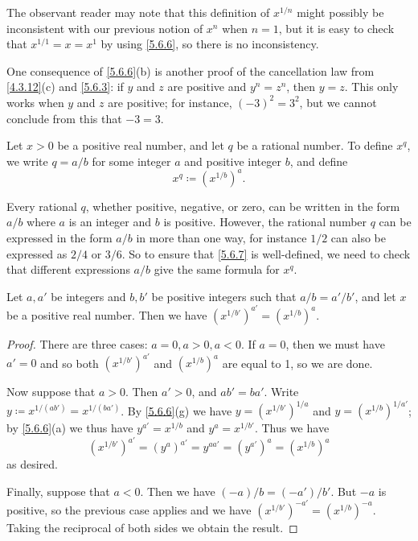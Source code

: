 \begin{note}
  The observant reader may note that this definition of \(x^{1 / n}\) might possibly be inconsistent with our previous notion of \(x^n\) when \(n = 1\), but it is easy to check that \(x^{1 / 1} = x = x^1\) by using \cref{5.6.6}, so there is no inconsistency.
\end{note}

\begin{note}
  One consequence of \cref{5.6.6}(b) is another proof of the cancellation law from \cref{4.3.12}(c) and \cref{5.6.3}:
  if \(y\) and \(z\) are positive and \(y^n = z^n\), then \(y = z\).
  This only works when \(y\) and \(z\) are positive;
  for instance, \((-3)^2 = 3^2\), but we cannot conclude from this that \(-3 = 3\).
\end{note}

\begin{definition}\label{5.6.7}
  Let \(x > 0\) be a positive real number, and let \(q\) be a rational number.
  To define \(x^q\), we write \(q = a / b\) for some integer \(a\) and positive integer \(b\), and define
  \[
    x^q \coloneqq (x^{1 / b})^a.
  \]
\end{definition}

\begin{note}
  Every rational \(q\), whether positive, negative, or zero, can be written in the form \(a / b\) where \(a\) is an integer and \(b\) is positive.
  However, the rational number \(q\) can be expressed in the form \(a / b\) in more than one way, for instance \(1 / 2\) can also be expressed as \(2 / 4\) or \(3 / 6\).
  So to ensure that \cref{5.6.7} is well-defined, we need to check that different expressions \(a / b\) give the same formula for \(x^q\).
\end{note}

\begin{lemma}\label{5.6.8}
  Let \(a, a'\) be integers and \(b, b'\) be positive integers such that \(a / b = a' / b'\), and let \(x\) be a positive real number.
  Then we have \((x^{1 / b'})^{a'} = (x^{1 / b})^a\).
\end{lemma}

\begin{proof}
  There are three cases: \(a = 0, a > 0, a < 0\).
  If \(a = 0\), then we must have \(a' = 0\) and so both \((x^{1 / b'})^{a'}\) and \((x^{1 / b})^a\) are equal to 1, so we are done.

  Now suppose that \(a > 0\).
  Then \(a' > 0\), and \(ab' = ba'\).
  Write \(y \coloneqq x^{1 / (ab')} = x^{1 / (ba')}\).
  By \cref{5.6.6}(g) we have \(y = (x^{1 / b'})^{1 / a}\) and \(y = (x^{1 / b})^{1 / a'}\);
  by \cref{5.6.6}(a) we thus have \(y^{a'} = x^{1 / b}\) and \(y^a = x^{1 / b'}\).
  Thus we have
  \[
    (x^{1 / b'})^{a'} = (y^a)^{a'} = y^{aa'} = (y^{a'})^a = (x^{1 / b})^a
  \]
  as desired.

  Finally, suppose that \(a < 0\).
  Then we have \((-a) / b = (-a') / b'\).
  But \(-a\) is positive, so the previous case applies and we have \((x^{1 / b'})^{-a'} = (x^{1 / b})^{-a}\).
  Taking the reciprocal of both sides we obtain the result.
\end{proof}

